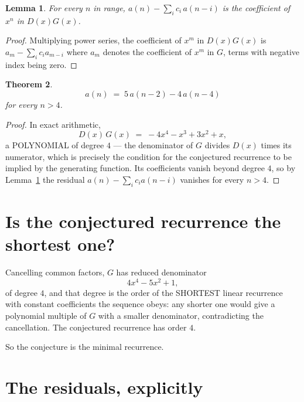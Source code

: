 \documentclass[11pt,a4paper]{article}
\theoremstyle{plain}
\newtheorem{theorem}{Theorem}
\newtheorem{lemma}[theorem]{Lemma}
\theoremstyle{definition}
\begin{document}
\begin{lemma}\label{lem:key}
For every $n$ in range, $a(n)-\sum_i c_i\,a(n-i)$ is the coefficient of $x^{n}$ in
$D(x)G(x)$.
\end{lemma}

\begin{proof}
Multiplying power series, the coefficient of $x^{m}$ in $D(x)G(x)$ is
$a_m-\sum_i c_i a_{m-i}$ where $a_m$ denotes the coefficient of $x^{m}$ in $G$, terms with
negative index being zero.
\end{proof}

\begin{theorem}
\[
a(n)\;=\;5\,a(n-2) - 4\,a(n-4)
\]
for every $n>4$.
\end{theorem}

\begin{proof}
In exact arithmetic,
\[
D(x)\,G(x)\;=\;- 4 x^{4} - x^{3} + 3 x^{2} + x,
\]
a POLYNOMIAL of degree $4$ --- the denominator of $G$ divides $D(x)$ times its numerator,
which is precisely the condition for the conjectured recurrence to be implied by the
generating function. Its coefficients vanish beyond degree $4$, so by
Lemma~\ref{lem:key} the residual $a(n)-\sum_ic_ia(n-i)$ vanishes for every
$n>4$.
\end{proof}

\section{Is the conjectured recurrence the shortest one?}

Cancelling common factors, $G$ has reduced denominator
\[
4 x^{4} - 5 x^{2} + 1,
\]
of degree $4$, and that degree is the order of the SHORTEST linear recurrence with
constant coefficients the sequence obeys: any shorter one would give a polynomial multiple of
$G$ with a smaller denominator, contradicting the cancellation. The conjectured recurrence has
order $4$.

So the conjecture is the minimal recurrence.

\section{The residuals, explicitly}
\end{document}
